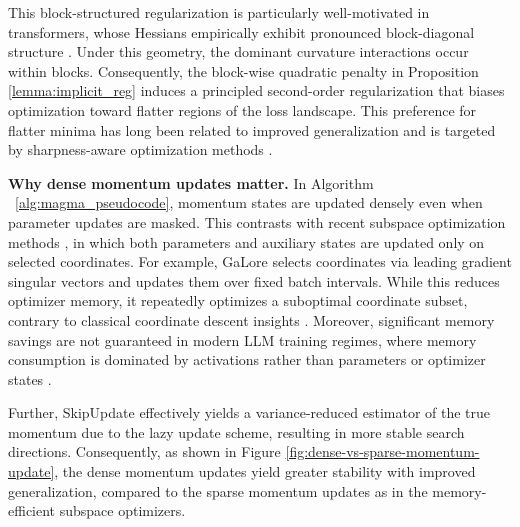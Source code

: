 \documentclass[11pt, a4paper, twocolumn, copyright, goog]{google}
\theoremstyle{plain}
\theoremstyle{definition}
\theoremstyle{remark}
\begin{document}
This block-structured regularization is particularly well-motivated in transformers, whose Hessians empirically exhibit pronounced block-diagonal structure \citep{zhang2024transformers,kunstner2024heavy,ormaniec2024does}.
Under this geometry, the dominant curvature interactions occur within blocks. 
Consequently, the block-wise quadratic penalty in Proposition \ref{lemma:implicit_reg} induces a principled second-order regularization that biases optimization toward flatter regions of the loss landscape. This preference for flatter minima has long been related to improved generalization \citep{hochreiter1997flat,keskar2016large} and is targeted by sharpness-aware optimization methods \citep{foret2020sharpness}.




\textbf{Why dense momentum updates matter.}
In Algorithm ~\ref{alg:magma_pseudocode}, momentum states are updated densely even when parameter updates are masked. 
This contrasts with recent subspace optimization methods \citep{pan2024lisa,zhao2024galore,luo2024badam}, in which both parameters and auxiliary states are updated only on selected coordinates.
For example, GaLore \citep{zhao2024galore} selects coordinates via leading gradient singular vectors and updates them over fixed batch intervals.
While this reduces optimizer memory, it repeatedly optimizes a suboptimal coordinate subset, contrary to classical coordinate descent insights \citep{nesterov2012efficiency,nutini2017let}.
Moreover, significant memory savings are not guaranteed in modern LLM training regimes, where  memory consumption is dominated by activations rather than parameters or optimizer states \citep{zhang2024revisiting,shamshoum2025compact}.



Further, SkipUpdate effectively yields a variance-reduced estimator of the true momentum due to the lazy update scheme, resulting in more stable search directions.
Consequently, as shown in Figure \ref{fig:dense-vs-sparse-momentum-update}, the dense momentum updates yield greater stability  with improved generalization, compared to the sparse momentum updates as in the memory-efficient subspace optimizers.
\end{document}

